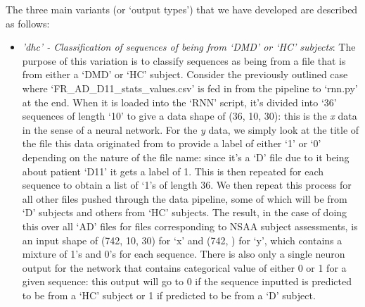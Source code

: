 \documentclass[12pt,twoside]{report}
\begin{document}
\quad The three main variants (or ‘output types’) that we have developed are described as follows:

\begin{itemize}
	\item \textit{'dhc' - Classification of sequences of being from ‘DMD’ or ‘HC’ subjects}: The purpose of this variation is to classify sequences as being from a file that is from either a ‘DMD’ or ‘HC’ subject. Consider the previously outlined case where ‘FR\_AD\_D11\_stats\_values.csv’ is fed in from the pipeline to ‘rnn.py’ at the end. When it is loaded into the ‘RNN’ script, it’s divided into ‘36’ sequences of length ‘10’ to give a data shape of (36, 10, 30): this is the \textit{x} data in the sense of a neural network. For the \textit{y} data, we simply look at the title of the file this data originated from to provide a label of either ‘1’ or ‘0’ depending on the nature of the file name: since it’s a ‘D’ file due to it being about patient ‘D11’ it gets a label of 1. This is then repeated for each sequence to obtain a list of ‘1’s of length 36. We then repeat this process for all other files pushed through the data pipeline, some of which will be from ‘D’ subjects and others from ‘HC’ subjects. The result, in the case of doing this over all ‘AD’ files for files corresponding to NSAA subject assessments, is an input shape of (742, 10, 30) for ‘x’ and (742, ) for ‘y’, which contains a mixture of 1’s and 0’s for each sequence. There is also only a single neuron output for the network that contains categorical value of either 0 or 1 for a given sequence: this output will go to 0 if the sequence inputted is predicted to be from a ‘HC’ subject or 1 if predicted to be from a ‘D’ subject.

\end{itemize}
\end{document}
